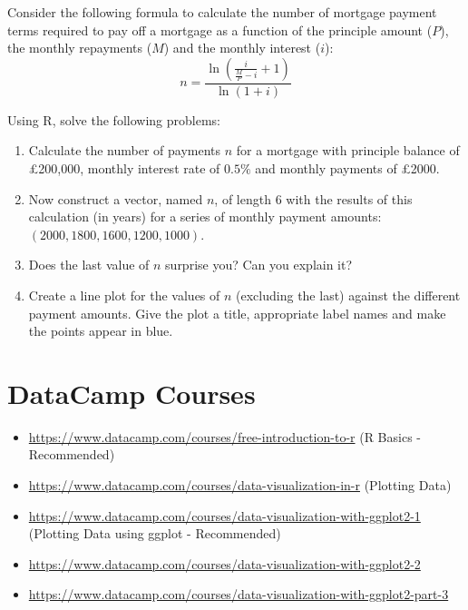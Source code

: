 \documentclass[
]{book}
\providecommand{\tightlist}{%
  \setlength{\itemsep}{0pt}\setlength{\parskip}{0pt}}
\theoremstyle{definition}
\theoremstyle{definition}
\theoremstyle{definition}
\theoremstyle{definition}
\theoremstyle{remark}
\begin{document}
Consider the following formula to calculate the number of mortgage payment terms required to pay off a mortgage as a function of the principle amount (\(P\)), the monthly repayments (\(M\)) and the monthly interest (\(i\)):
\begin{equation*}
    n = \frac{\ln\left(\frac{i}{\frac{M}{P}-i}+1 \right)}{\ln(1+i)}
\end{equation*}

Using R, solve the following problems:

\begin{enumerate}
\def\labelenumi{\arabic{enumi}.}
\tightlist
\item
  Calculate the number of payments \(n\) for a mortgage with principle balance of £200,000, monthly interest rate of \(0.5\%\) and monthly payments of £2000.
\item
  Now construct a vector, named \(n\), of length 6 with the results of this calculation (in years) for a series of monthly payment amounts: \((2000, 1800, 1600, 1200, 1000)\).
\item
  Does the last value of \(n\) surprise you? Can you explain it?
\item
  Create a line plot for the values of \(n\) (excluding the last) against the different payment amounts. Give the plot a title, appropriate label names and make the points appear in blue.
\end{enumerate}

\hypertarget{datacamp-courses}{%
\section{DataCamp Courses}\label{datacamp-courses}}

\begin{itemize}
\tightlist
\item
  \url{https://www.datacamp.com/courses/free-introduction-to-r} (R Basics - Recommended)
\item
  \url{https://www.datacamp.com/courses/data-visualization-in-r} (Plotting Data)
\item
  \url{https://www.datacamp.com/courses/data-visualization-with-ggplot2-1} (Plotting Data using ggplot - Recommended)
\item
  \url{https://www.datacamp.com/courses/data-visualization-with-ggplot2-2}
\item
  \url{https://www.datacamp.com/courses/data-visualization-with-ggplot2-part-3}
\end{itemize}
\end{document}
